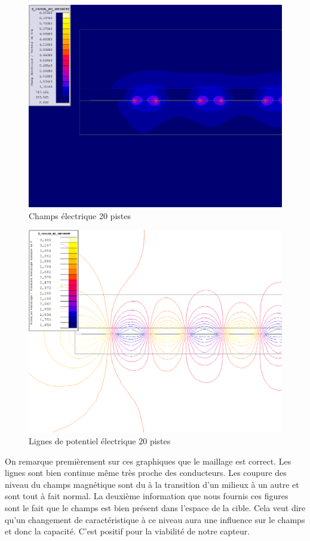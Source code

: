 \begin{figure}[!ht]
 \centering
 \includegraphics[width=14cm]{simulationChampElectrique.png}
 \caption{Champs électrique 20 pistes}
\end{figure}

\newpage
\begin{figure}[!ht]
 \centering
 \includegraphics[width=14cm]{C20air.png}
 \caption{Lignes de potentiel électrique 20 pistes}
\end{figure}

On remarque premièrement sur ces graphiques que le maillage est correct. Les lignes sont bien continue même très proche des conducteurs. Les coupure des niveau du champs magnétique sont du à la transition d'un milieux à un autre et sont tout à fait normal. La deuxième information que nous fournis ces figures sont le fait que le champs est bien présent dans l'espace de la cible. Cela veut dire qu'un changement de caractéristique à ce niveau aura une influence sur le champs et donc la capacité. C'est positif pour la viabilité de notre capteur.

